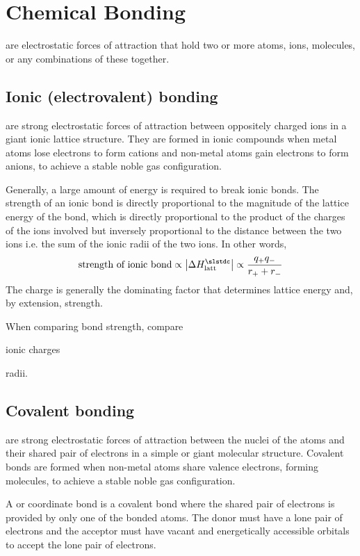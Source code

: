 \documentclass[Chemistry.tex]{subfiles}
\begin{document}
\chapter{Chemical Bonding}
 are electrostatic forces of attraction that hold two or more atoms, ions, molecules, or any combinations of these together.
\section{Ionic (electrovalent) bonding}
 are strong electrostatic forces of attraction between oppositely charged ions in a giant ionic lattice structure. They are formed in ionic compounds when metal atoms lose electrons to form cations and non-metal atoms gain electrons to form anions, to achieve a stable noble gas configuration.

Generally, a large amount of energy is required to break ionic bonds. The strength of an ionic bond is directly proportional to the magnitude of the lattice energy of the bond, which is directly proportional to the product of the charges of the ions involved but inversely proportional to the distance between the two ions i.e. the sum of the ionic radii of the two ions. In other words, \[\text{strength of ionic bond} \propto \left|\Delta H_\text{latt}^\slstdc\right|\propto\frac{q_+q_-}{r_++r_-}\] The charge is generally the dominating factor that determines lattice energy and, by extension, strength.

When comparing bond strength, compare
\begin{slinenum}
\item ionic charges
\item radii.
\end{slinenum}
\section{Covalent bonding}
 are strong electrostatic forces of attraction between the nuclei of the atoms and their shared pair of electrons in a simple or giant molecular structure. Covalent bonds are formed when non-metal atoms share valence electrons, forming molecules, to achieve a stable noble gas configuration.

A  or coordinate bond is a covalent bond where the shared pair of electrons is provided by only one of the bonded atoms. The donor must have a lone pair of electrons and the acceptor must have vacant and energetically accessible orbitals to accept the lone pair of electrons.
\end{document}
